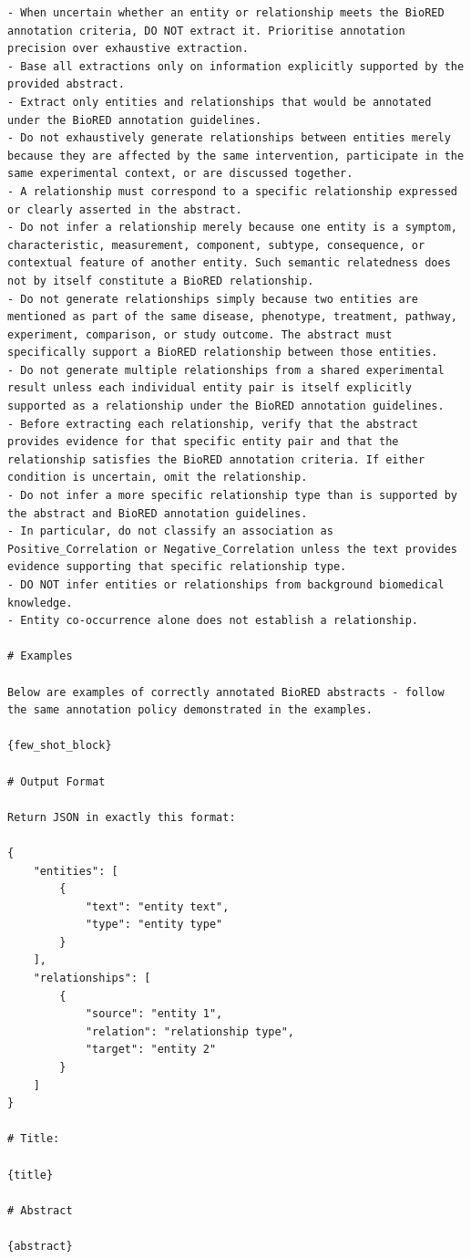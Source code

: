\begin{lstlisting}
- When uncertain whether an entity or relationship meets the BioRED annotation criteria, DO NOT extract it. Prioritise annotation precision over exhaustive extraction.
- Base all extractions only on information explicitly supported by the provided abstract.
- Extract only entities and relationships that would be annotated under the BioRED annotation guidelines.
- Do not exhaustively generate relationships between entities merely because they are affected by the same intervention, participate in the same experimental context, or are discussed together.
- A relationship must correspond to a specific relationship expressed or clearly asserted in the abstract.
- Do not infer a relationship merely because one entity is a symptom, characteristic, measurement, component, subtype, consequence, or contextual feature of another entity. Such semantic relatedness does not by itself constitute a BioRED relationship.
- Do not generate relationships simply because two entities are mentioned as part of the same disease, phenotype, treatment, pathway, experiment, comparison, or study outcome. The abstract must specifically support a BioRED relationship between those entities.
- Do not generate multiple relationships from a shared experimental result unless each individual entity pair is itself explicitly supported as a relationship under the BioRED annotation guidelines.
- Before extracting each relationship, verify that the abstract provides evidence for that specific entity pair and that the relationship satisfies the BioRED annotation criteria. If either condition is uncertain, omit the relationship.
- Do not infer a more specific relationship type than is supported by the abstract and BioRED annotation guidelines.
- In particular, do not classify an association as Positive_Correlation or Negative_Correlation unless the text provides evidence supporting that specific relationship type.
- DO NOT infer entities or relationships from background biomedical knowledge.
- Entity co-occurrence alone does not establish a relationship.

# Examples

Below are examples of correctly annotated BioRED abstracts - follow the same annotation policy demonstrated in the examples.

{few_shot_block}

# Output Format

Return JSON in exactly this format:

{
	"entities": [
		{
			"text": "entity text",
			"type": "entity type"
		}
	],
	"relationships": [
		{
			"source": "entity 1",
			"relation": "relationship type",
			"target": "entity 2"
		}
	]
}

# Title:

{title}

# Abstract

{abstract}
\end{lstlisting}